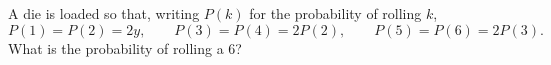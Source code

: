 A die is loaded so that, writing $P(k)$ for the probability of rolling $k$,
\[P(1)=P(2)=2y,\qquad P(3)=P(4)=2P(2),\qquad P(5)=P(6)=2P(3).\]
What is the probability of rolling a $6$?
